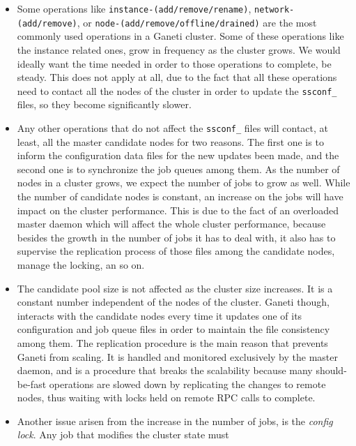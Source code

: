 \begin{itemize}
  \item Some operations like \texttt{instance-(add/remove/rename)},
        \texttt{network-(add/remove)}, or
        \texttt{node-(add/remove/offline/drained)} are the most commonly used
        operations in a Ganeti cluster. Some of these operations like the
        instance related ones, grow in frequency as the cluster grows. We would
        ideally want the  time needed in order to those operations to complete,
        be steady. This does not apply at all, due to the fact that all these
        operations need to contact all the nodes of the cluster in order to
        update the \texttt{ssconf\_} files, so they become significantly slower.
  \item Any other operations that do not affect the \texttt{ssconf\_} files
        will contact, at least, all the master candidate nodes for two reasons.
        The first one is to inform the configuration data files for the new
        updates been made, and the second one is to synchronize the job queues
        among them. As the number of nodes in a cluster grows, we expect the
        number of jobs to grow as well. While the number of candidate nodes is
        constant, an increase on the jobs will have impact on the cluster
        performance. This is due to the fact of an overloaded master daemon
        which will affect the whole cluster performance, because besides the
        growth in the number of jobs it has to deal with, it also has to
        supervise the replication process of those files among the candidate
        nodes, manage the locking, an so on.
  \item The candidate pool size is not affected as the cluster size
        increases. It is a constant number independent of the nodes of the
        cluster. Ganeti though, interacts with the candidate nodes every time
        it updates one of its configuration and job queue files in order to
        maintain the file consistency among them. The replication procedure is
        the main reason that prevents Ganeti from scaling. It is handled and
        monitored exclusively by the master daemon, and is a procedure that
        breaks the scalability because many should-be-fast operations are slowed
        down by replicating the changes to remote nodes, thus waiting with locks
        held on remote RPC calls to complete.
  \item Another issue arisen from the increase in the number of jobs, is the
        \emph{config lock}. Any job that modifies the cluster state must

\end{itemize}
